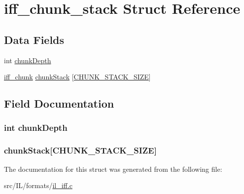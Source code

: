 \hypertarget{structiff__chunk__stack}{\section{iff\-\_\-chunk\-\_\-stack Struct Reference}
\label{structiff__chunk__stack}
}
\subsection*{Data Fields}
\begin{DoxyCompactItemize}
\item 
int \hyperlink{structiff__chunk__stack_a4eeb3aa9d8e278fb890cef97dd80a950}{chunk\-Depth}
\item 
\hyperlink{il__iff_8c_a4133cb044d88ace97eb9c079607ff272}{iff\-\_\-chunk} \hyperlink{structiff__chunk__stack_afb0d147335b311495e8d9b5cdfb29e26}{chunk\-Stack} \mbox{[}\hyperlink{il__iff_8c_a0bac4908217dfda831b95cc7e0bbdd8a}{C\-H\-U\-N\-K\-\_\-\-S\-T\-A\-C\-K\-\_\-\-S\-I\-Z\-E}\mbox{]}
\end{DoxyCompactItemize}


\subsection{Field Documentation}
\hypertarget{structiff__chunk__stack_a4eeb3aa9d8e278fb890cef97dd80a950}{
\subsubsection[{chunk\-Depth}]{\setlength{\rightskip}{0pt plus 5cm}int chunk\-Depth}}\label{structiff__chunk__stack_a4eeb3aa9d8e278fb890cef97dd80a950}
\hypertarget{structiff__chunk__stack_afb0d147335b311495e8d9b5cdfb29e26}{
\subsubsection[{chunk\-Stack}]{ chunk\-Stack\mbox{[}{\bf C\-H\-U\-N\-K\-\_\-\-S\-T\-A\-C\-K\-\_\-\-S\-I\-Z\-E}\mbox{]}}}\label{structiff__chunk__stack_afb0d147335b311495e8d9b5cdfb29e26}


The documentation for this struct was generated from the following file\-:\begin{DoxyCompactItemize}
\item 
src/\-I\-L/formats/\hyperlink{il__iff_8c}{il\-\_\-iff.\-c}\end{DoxyCompactItemize}
